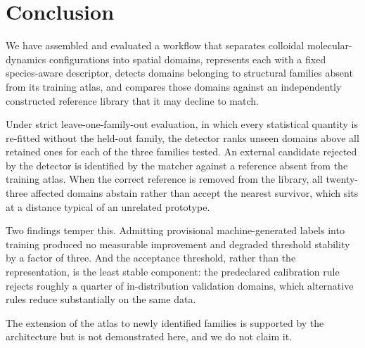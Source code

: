 \section{Conclusion}
\label{sec:conclusion}

We have assembled and evaluated a workflow that separates colloidal molecular-dynamics
configurations into spatial domains, represents each with a fixed species-aware descriptor,
detects domains belonging to structural families absent from its training atlas, and
compares those domains against an independently constructed reference library that it may
decline to match.

Under strict leave-one-family-out evaluation, in which every statistical quantity is re-fitted
without the held-out family, the detector ranks unseen domains above all retained ones for
each of the three families tested. An external candidate rejected by the detector is
identified by the matcher against a reference absent from the training atlas. When the
correct reference is removed from the library, all twenty-three affected domains abstain
rather than accept the nearest survivor, which sits at a distance typical of an unrelated
prototype.

Two findings temper this. Admitting provisional machine-generated labels into training
produced no measurable improvement and degraded threshold stability by a factor of three.
And the acceptance threshold, rather than the representation, is the least stable component:
the predeclared calibration rule rejects roughly a quarter of in-distribution validation
domains, which alternative rules reduce substantially on the same data.

The extension of the atlas to newly identified families is supported by the architecture but
is not demonstrated here, and we do not claim it.
